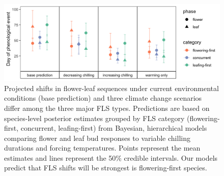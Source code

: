 \documentclass[11pt]{article}\usepackage[]{graphicx}\usepackage[]{color}
\begin{document}
\pagebreak

\begin{figure}[h!]
    \centering
 \includegraphics[width=\textwidth]{..//Plots/Flobuds_manuscript_figs/posteriorgroups_go.png}
    \caption{Projected shifts in flower-leaf sequences under current environmental conditions (base prediction) and three climate change scenarios differ among the three major FLS types. Predictions are based on species-level posterior estimates grouped by FLS category (flowering-first, concurrent, leafing-first) from Bayesian, hierarchical models comparing flower and leaf bud responses to variable chilling durations and forcing temperatures. Points represent the mean estimates and lines represent the 50\% credible intervals. Our models predict that FLS shifts will be strongest is flowering-first species.}
    \label{fig:preddy}
\end{figure}
\end{document}
